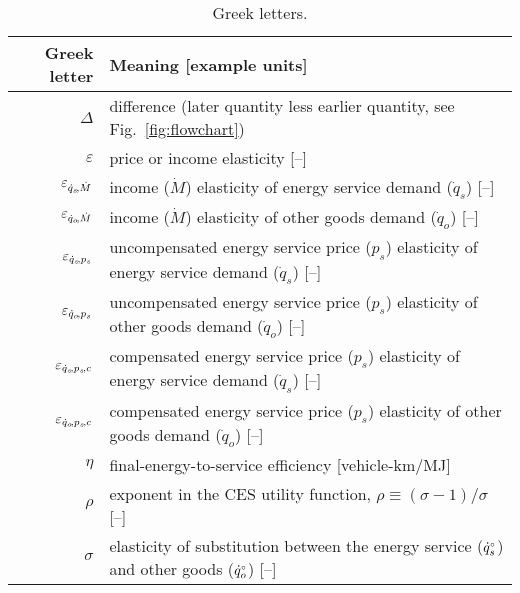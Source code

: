 
\begin{table}
\footnotesize
\centering %
\caption{Greek letters.}
\begin{tabular}{r l}
  \toprule
  Greek letter & Meaning [example units] \\
  \midrule
  $\Delta$       & difference (later quantity less earlier quantity, see Fig.~\ref{fig:flowchart}) \\
  $\varepsilon$  & price or income elasticity [--] \\
  $\varepsilon_{\dot{q}_s\!,\dot{M}}$        & income ($\dot{M}$) elasticity of energy service demand ($\dot{q}_s$) [--] \\
  $\varepsilon_{\dot{q}_o\!,\dot{M}}$        & income ($\dot{M}$) elasticity of other goods demand ($\dot{q}_o$) [--] \\
  $\varepsilon_{\dot{q}_s\!,p_s}$     & uncompensated energy service price ($p_s$) elasticity of energy service demand ($\dot{q}_s$) [--] \\
  $\varepsilon_{\dot{q}_o\!,p_s}$     & uncompensated energy service price ($p_s$) elasticity of other goods demand ($\dot{q}_o$) [--] \\
  $\varepsilon_{\dot{q}_s\!,p_s\!,c}$      & compensated energy service price ($p_s$) elasticity of energy service demand ($\dot{q}_s$) [--] \\
  $\varepsilon_{\dot{q}_o\!,p_s\!,c}$      & compensated energy service price ($p_s$) elasticity of other goods demand ($\dot{q}_o$) [--] \\
  $\eta$         & final-energy-to-service efficiency [vehicle-km/MJ] \\
  $\rho$         & exponent in the CES utility function, $\rho \equiv (\sigma - 1) / \sigma$ [--] \\
  $\sigma$       & elasticity of substitution between the energy service (${}{\dot{q}}^{\scriptscriptstyle \circ}_s$) and other goods (${}{\dot{q}}^{\scriptscriptstyle \circ}_o$) [--] \\
  \bottomrule
\end{tabular}
\label{tab:greek}
\end{table}



